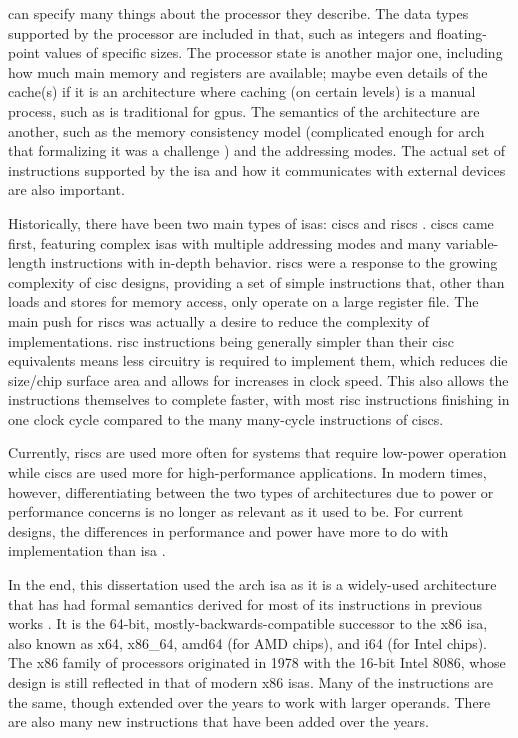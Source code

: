  can specify many things about the processor they describe.
The data types supported by the processor are included in that,
such as integers and floating-point values of specific sizes.
The processor state is another major one, including how much main memory and registers
are available; maybe even details of the cache(s) if it is an architecture
where caching (on certain levels) is a manual process, such as is traditional
for \acp{gpu}.
The semantics of the architecture are another, such as the memory consistency model
(complicated enough for \gls{arch} that formalizing it was a challenge
\autocite{sewell2010tso,owens2009tso,owens2009tsoextended})
and the addressing modes.
The actual set of instructions supported by the \ac{isa}
and how it communicates with external devices are also important.

Historically, there have been two main types of \acp{isa}:
\acp{cisc} and \acp{risc} \autocite{jamil1995rc}.
\Acp{cisc} came first, featuring complex \acp{isa} with multiple addressing modes
and many variable-length instructions with in-depth behavior.
\Acp{risc} were a response to the growing complexity of \ac{cisc} designs,
providing a set of simple instructions that,
other than loads and stores for memory access, only operate on a large register file.
The main push for \acp{risc} was actually a desire
to reduce the complexity of implementations. \Ac{risc} instructions being
generally simpler than their \ac{cisc} equivalents
means less circuitry is required to implement them,
which reduces die size/chip surface area and allows for increases in clock speed.
This also allows the instructions themselves to complete faster,
with most \ac{risc} instructions finishing in one clock cycle
compared to the many many-cycle instructions of \acp{cisc}.

Currently, \acp{risc} are used more often for systems that require
low-power operation while \acp{cisc} are used more for high-performance applications.
In modern times, however, differentiating between the two types of architectures
due to power or performance concerns is no longer as relevant as it used to be.
For current designs, the differences in performance and power
have more to do with implementation than \ac{isa} \autocite{blem2013struggles}.

In the end,
this dissertation used the \gls{arch} \ac{isa} as it is a widely-used architecture
that has had formal semantics derived for most of its instructions
in previous works \autocite{heule2016stratified,roessle2019verified}.
It is the 64-bit, mostly-backwards-compatible successor to the \gls{x86} \ac{isa},
also known as \gls{x64}, \gls{x86_64}, \gls{amd64} (for AMD chips), and \gls{i64} (for Intel chips).
The \gls{x86} family of processors originated in 1978 with the 16-bit Intel 8086,
whose design is still reflected in that of modern \gls{x86} \acp{isa}.
Many of the instructions are the same,
though extended over the years to work with larger operands.
There are also many new instructions that have been added over the years.

